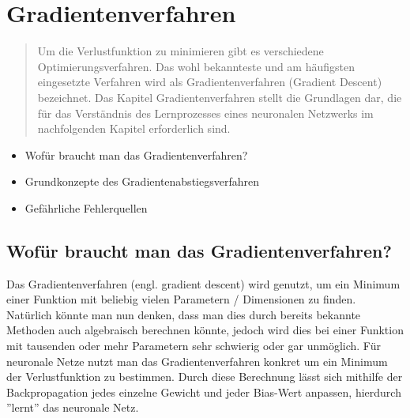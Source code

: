 \newpage
\thispagestyle{empty}
\section{Gradientenverfahren}\label{sec:gradientenverfahren}   
\begin{tcolorbox}[title={Inhalte des \textit{Gradientenverfahren}}]
  \begin{quotation}\noindent
    Um die Verlustfunktion zu minimieren gibt es verschiedene Optimierungsverfahren. Das wohl bekannteste und am häufigsten eingesetzte Verfahren wird als Gradientenverfahren (Gradient Descent) bezeichnet.
    Das Kapitel Gradientenverfahren stellt die Grundlagen dar, die für das Verständnis des Lernprozesses eines neuronalen Netzwerks im nachfolgenden Kapitel erforderlich sind.
  \end{quotation}
  \begin{itemize}
    \item Wofür braucht man das Gradientenverfahren?
    \item Grundkonzepte des Gradientenabstiegsverfahren
    \item Gefährliche Fehlerquellen

  \end{itemize}
\end{tcolorbox}


\subsection{Wofür braucht man das Gradientenverfahren?}\label{subsec:gradientenverfahren:wofuer}
Das Gradientenverfahren (engl. gradient descent) wird genutzt, um ein Minimum einer Funktion mit beliebig vielen Parametern / Dimensionen zu finden.
Natürlich könnte man nun denken, dass man dies durch bereits bekannte Methoden auch algebraisch berechnen könnte, jedoch wird dies 
bei einer Funktion mit tausenden oder mehr Parametern sehr schwierig oder gar unmöglich.
Für neuronale Netze nutzt man das Gradientenverfahren konkret um ein Minimum der Verlustfunktion zu bestimmen. 
Durch diese Berechnung lässt sich mithilfe der Backpropagation jedes einzelne Gewicht und jeder Bias-Wert anpassen, hierdurch ''lernt'' das neuronale Netz.

\iffalse
